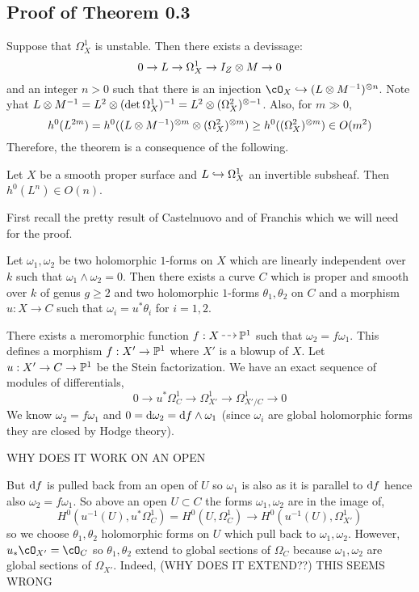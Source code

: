 \documentclass[12pt]{article}
\begin{document}
\subsection{Proof of Theorem 0.3}

Suppose that $\Omega_X^1$ is unstable. Then there exists a devissage:
\[ 0 \to L \to \Omega^1_X \to I_Z \ot M \to 0 \]
and an integer $n > 0$ such that there is an injection $\cO_X \embed (L \ot M^{-1})^{\ot n}$. Note yhat $L \ot M^{-1}  = L^2 \ot (\det{\Omega^1_X})^{-1} = L^2 \ot (\Omega_X^2)^{\ot -1}$. Also, for $m \gg 0$,
\[ h^0(L^{2m}) = h^0((L \ot M^{-1})^{\ot m} \ot (\Omega^2_X)^{\ot m}) \ge h^0((\Omega_X^2)^{\ot m}) \in O(m^2) \]
Therefore, the theorem is a consequence of the following.

\begin{theorem}[Bogomolov]
Let $X$ be a smooth proper surface and $L \embed \Omega_X^1$ an invertible subsheaf. Then $h^0(L^n) \in O(n)$. 
\end{theorem}

First recall the pretty result of Castelnuovo and of Franchis which we will need for the proof.

\begin{lemma}[4, 12]
Let $\omega_1, \omega_2$ be two holomorphic $1$-forms on $X$ which are linearly independent over $k$ such that $\omega_1 \wedge \omega_2 = 0$. Then there exists a curve $C$ which is proper and smooth over $k$ of genus $g \ge 2$ and two holomorphic $1$-forms $\theta_1, \theta_2$ on $C$ and a morphism $u : X \to C$ such that $\omega_i = u^* \theta_i$ for $i = 1,2$.
\end{lemma}

There exists a meromorphic function $f : X \rat \P^1$ such that $\omega_2 = f \omega_1$. This defines a morphism $f : X' \to \P^1$ where $X'$ is a blowup of $X$. Let $u : X' \to C \to \P^1$ be the Stein factorization.  We have an exact sequence of modules of differentials,
\[ 0 \to u^* \Omega^1_C \to \Omega^1_{X'} \to \Omega^1_{X'/C} \to 0 \]
We know $\omega_2 = f \omega_1$ and $0 = \d{\omega_2} = \d{f} \wedge \omega_1$ (since $\omega_i$ are global holomorphic forms they are closed by Hodge theory). 

{\color{red} WHY DOES IT WORK ON AN OPEN}

But $\d{f}$ is pulled back from an open of $U$ so $\omega_1$ is also as it is parallel to $\d{f}$ hence also $\omega_2 = f \omega_1$. So above an open $U \subset C$ the forms $\omega_1, \omega_2$ are in the image of,
\[ H^0(u^{-1}(U), u^* \Omega_C^1) = H^0(U, \Omega^1_C) \to H^0(u^{-1}(U), \Omega^1_{X'}) \]
so we choose $\theta_1, \theta_2$ holomorphic forms on $U$ which pull back to $\omega_1, \omega_2$. However, $u_* \cO_{X'} = \cO_{C}$ so $\theta_1, \theta_2$ extend to global sections of $\Omega_C$ because $\omega_1, \omega_2$ are global sections of $\Omega_{X'}$. Indeed,
{\color{red} (WHY DOES IT EXTEND??) THIS SEEMS WRONG}
\end{document}
